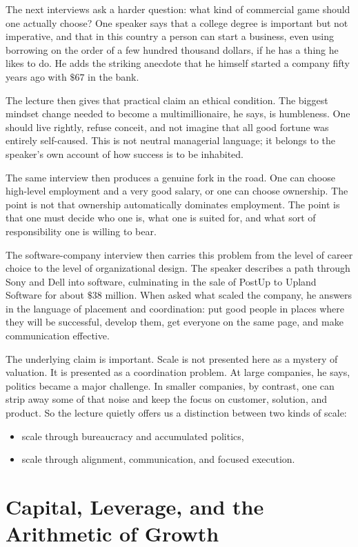 The next interviews ask a harder question: what kind of commercial game should one actually choose? One speaker says that a college degree is important but not imperative, and that in this country a person can start a business, even using borrowing on the order of a few hundred thousand dollars, if he has a thing he likes to do. He adds the striking anecdote that he himself started a company fifty years ago with \( \$67 \) in the bank.

The lecture then gives that practical claim an ethical condition. The biggest mindset change needed to become a multimillionaire, he says, is humbleness. One should live rightly, refuse conceit, and not imagine that all good fortune was entirely self-caused. This is not neutral managerial language; it belongs to the speaker's own account of how success is to be inhabited.

The same interview then produces a genuine fork in the road. One can choose high-level employment and a very good salary, or one can choose ownership. The point is not that ownership automatically dominates employment. The point is that one must decide who one is, what one is suited for, and what sort of responsibility one is willing to bear.

The software-company interview then carries this problem from the level of career choice to the level of organizational design. The speaker describes a path through Sony and Dell into software, culminating in the sale of PostUp to Upland Software for about \( \$38 \) million. When asked what scaled the company, he answers in the language of placement and coordination: put good people in places where they will be successful, develop them, get everyone on the same page, and make communication effective.

The underlying claim is important. Scale is not presented here as a mystery of valuation. It is presented as a coordination problem. At large companies, he says, politics became a major challenge. In smaller companies, by contrast, one can strip away some of that noise and keep the focus on customer, solution, and product. So the lecture quietly offers us a distinction between two kinds of scale:
\begin{itemize}
\item scale through bureaucracy and accumulated politics,
\item scale through alignment, communication, and focused execution.
\end{itemize}

\section{Capital, Leverage, and the Arithmetic of Growth}

